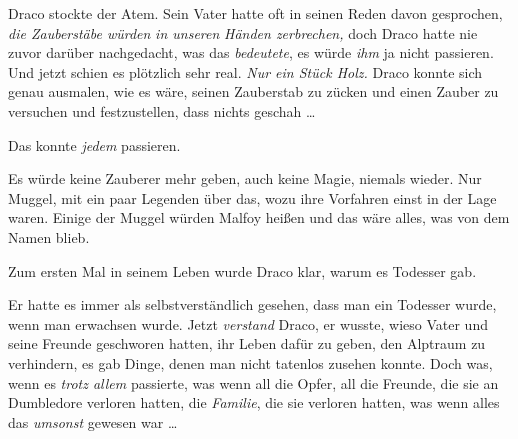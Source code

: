 Draco stockte der Atem. Sein Vater hatte oft in seinen Reden davon gesprochen, \emph{die Zauberstäbe würden} \emph{in unseren} \emph{Händen zerbrechen,} doch Draco hatte nie zuvor darüber nachgedacht, was das \emph{bedeutete}, es würde \emph{ihm} ja nicht passieren. Und jetzt schien es plötzlich sehr real. \emph{Nur ein Stück Holz.} Draco konnte sich genau ausmalen, wie es wäre, seinen Zauberstab zu zücken und einen Zauber zu versuchen und festzustellen, dass nichts geschah …

Das konnte \emph{jedem} passieren.

Es würde keine Zauberer mehr geben, auch keine Magie, niemals wieder. Nur Muggel, mit ein paar Legenden über das, wozu ihre Vorfahren einst in der Lage waren. Einige der Muggel würden Malfoy heißen und das wäre alles, was von dem Namen blieb.

Zum ersten Mal in seinem Leben wurde Draco klar, warum es Todesser gab.

Er hatte es immer als selbstverständlich gesehen, dass man ein Todesser wurde, wenn man erwachsen wurde. Jetzt \emph{verstand} Draco, er wusste, wieso Vater und seine Freunde geschworen hatten, ihr Leben dafür zu geben, den Alptraum zu verhindern, es gab Dinge, denen man nicht tatenlos zusehen konnte. Doch was, wenn es \emph{trotz allem} passierte, was wenn all die Opfer, all die Freunde, die sie an Dumbledore verloren hatten, die \emph{Familie}, die sie verloren hatten, was wenn alles das \emph{umsonst} gewesen war …

